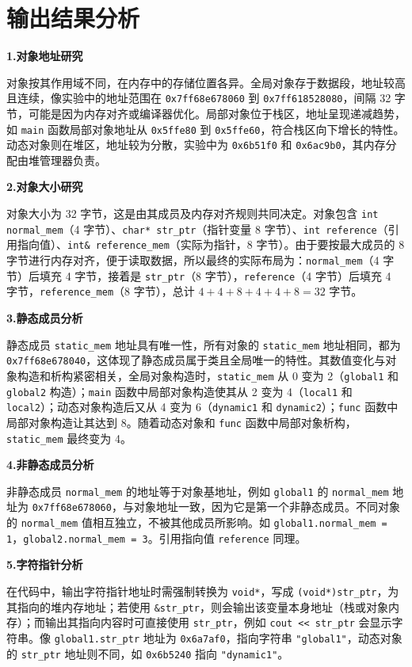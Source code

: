 \documentclass{article}
\begin{document}
\section{输出结果分析}
\textbf{1.对象地址研究}

对象按其作用域不同，在内存中的存储位置各异。全局对象存于数据段，地址较高且连续，像实验中的地址范围在 \texttt{0x7ff68e678060} 到 \texttt{0x7ff618528080}，间隔 32 字节，可能是因为内存对齐或编译器优化。局部对象位于栈区，地址呈现递减趋势，如 \texttt{main} 函数局部对象地址从 \texttt{0x5ffe80} 到 \texttt{0x5ffe60}，符合栈区向下增长的特性。动态对象则在堆区，地址较为分散，实验中为 \texttt{0x6b51f0} 和 \texttt{0x6ac9b0}，其内存分配由堆管理器负责。

\textbf{2.对象大小研究}

对象大小为 32 字节，这是由其成员及内存对齐规则共同决定。对象包含 \texttt{int normal\_mem}（4 字节）、\texttt{char* str\_ptr}（指针变量 8 字节）、\texttt{int reference}（引用指向值）、\texttt{int\& reference\_mem}（实际为指针，8 字节）。由于要按最大成员的 8 字节进行内存对齐，便于读取数据，所以最终的实际布局为：\texttt{normal\_mem}（4 字节）后填充 4 字节，接着是 \texttt{str\_ptr}（8 字节），\texttt{reference}（4 字节）后填充 4 字节，\texttt{reference\_mem}（8 字节），总计 $4 + 4 + 8 + 4 + 4 + 8 = 32$ 字节。

\textbf{3.静态成员分析}

静态成员 \texttt{static\_mem} 地址具有唯一性，所有对象的 \texttt{static\_mem} 地址相同，都为 \texttt{0x7ff68e678040}，这体现了静态成员属于类且全局唯一的特性。其数值变化与对象构造和析构紧密相关，全局对象构造时，\texttt{static\_mem} 从 0 变为 2（\texttt{global1} 和 \texttt{global2} 构造）；\texttt{main} 函数中局部对象构造使其从 2 变为 4（\texttt{local1} 和 \texttt{local2}）；动态对象构造后又从 4 变为 6（\texttt{dynamic1} 和 \texttt{dynamic2}）；\texttt{func} 函数中局部对象构造让其达到 8。随着动态对象和 \texttt{func} 函数中局部对象析构，\texttt{static\_mem} 最终变为 4。

\textbf{4.非静态成员分析}

非静态成员 \texttt{normal\_mem} 的地址等于对象基地址，例如 \texttt{global1} 的 \texttt{normal\_mem} 地址为 \texttt{0x7ff68e678060}，与对象地址一致，因为它是第一个非静态成员。不同对象的 \texttt{normal\_mem} 值相互独立，不被其他成员所影响。如 \texttt{global1.normal\_mem = 1}，\texttt{global2.normal\_mem = 3}。引用指向值 \texttt{reference} 同理。

\textbf{5.字符指针分析}

在代码中，输出字符指针地址时需强制转换为 \texttt{void*}，写成 \texttt{(void*)str\_ptr}，为其指向的堆内存地址；若使用 \texttt{\&str\_ptr}，则会输出该变量本身地址（栈或对象内存）；而输出其指向内容时可直接使用 \texttt{str\_ptr}，例如 \texttt{cout << str\_ptr} 会显示字符串。像 \texttt{global1.str\_ptr} 地址为 \texttt{0x6a7af0}，指向字符串 \texttt{"global1"}，动态对象的 \texttt{str\_ptr} 地址则不同，如 \texttt{0x6b5240} 指向 \texttt{"dynamic1"}。
\end{document}

